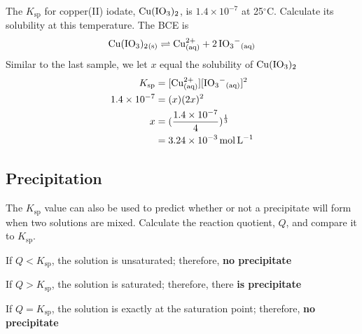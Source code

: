 \begin{sample}{The $K_\mathrm{sp}$ for copper(II) iodate, $\ch{Cu(IO3)2}$, is $1.4\times10^{-7}$
    at 25$^{\circ}$C. Calculate its solubility at this temperature.}
    The BCE is 
    \[
        \ch{Cu(IO3)2_{(s)}}\rightleftharpoons \ch{Cu^{2+}_{(aq)}}+\ch{2IO3^-_{(aq)}}
    \]
    Similar to the last sample, we let $x$ equal the solubility of $\ch{Cu(IO3)2}$
    \begin{align*}
        K_\mathrm{sp}&=[\ch{Cu^{2+}_{(aq)}}][\ch{IO3^-_{(aq)}}]^2\\
        1.4\times10^{-7}&=(x)(2x)^2\\
        x&=(\frac{1.4\times10^{-7}}{4})^\frac{1}{3}\\
         &=3.24\times10^{-3}\,\si{mol.L^{-1}}
    \end{align*}
\end{sample}

\subsection{Precipitation}
The $K_\mathrm{sp}$ value can also be used to predict whether or not a precipitate will form when
two solutions are mixed. Calculate the reaction quotient, $Q$, and compare it to $K_\mathrm{sp}$.
\begin{bulleted-list}
    \item If $Q<K_\mathrm{sp}$, the solution is unsaturated; therefore, \textbf{no precipitate}
    \item If $Q>K_\mathrm{sp}$, the solution is saturated; therefore, there \textbf{is precipitate}
    \item If $Q=K_\mathrm{sp}$, the solution is exactly at the saturation point; therefore, \textbf{no precipitate}
\end{bulleted-list}

